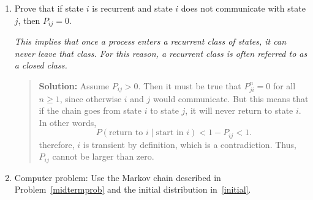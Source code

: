 \documentclass{article}
\begin{document}
\begin{enumerate}
\begin{enumerate}
  \item Suppose you know that it rained on days one, two, and three. What is the
  probability that it will rain on day seven? (You are welcome to use a computer
  for this, but please explain what you did.)
    \begin{quotation}{\bf Solution:}
    The answer to this question will be found in the bottom row of $P^4$.
    This is because we start in state 7 (rain, rain, rain) at time $t=3$ and take
    four steps of the Markov chain to get to time $t=7$.  Thus, the bottom
    row (corresponding to beginning in state 7) gives the probability of all eight
    states.  The even states are ``no rain'' and the odd states are ``rain''.  Here is the
    R code to calculate the answer:
\begin{Schunk}
\begin{Sinput}
> r <- rep(0,8)
> P <- matrix(c(9,1,r,4,6,r,6,4,r,2,8,6,4,r,4,6,r,6,4,r,3,7),8,8,byrow=T)/10
> P4 <- P %*% P %*% P %*% P
> sum(P4[8, c(2, 4, 6, 8)])
\end{Sinput}
\begin{Soutput}
[1] 0.5305
\end{Soutput}
\end{Schunk}
    \end{quotation}

  \end{enumerate}

  \item Prove that if state $i$ is recurrent and state $i$ does not communicate
  with state $j$, then $P_{ij}=0$.

  {\em This implies that once a process enters a recurrent class of states, it
  can never leave that class. For this reason, a recurrent class is often
  referred to as a {\em closed} class.}
    \begin{quotation}{\bf Solution:}
    Assume $P_{ij}>0$.  Then it must be true that $P_{ji}^n=0$ for all $n\ge 1$, since
    otherwise $i$ and $j$ would communicate.  But this means that if the chain goes from
    state $i$ to state $j$, it will never return to state $i$.  In other words,
    \[
    P(\mbox{return to  $i$} \mid \mbox{start in $i$}) < 1-P_{ij} < 1.
    \]
    therefore, $i$ is transient by definition, which is a contradiction.  Thus, $P_{ij}$ cannot
    be larger than zero.
    \end{quotation}


  \item Computer problem: Use the Markov chain described in Problem~\ref{midtermprob}
  and the initial distribution in~\ref{initial}.


\end{enumerate}
\end{document}
